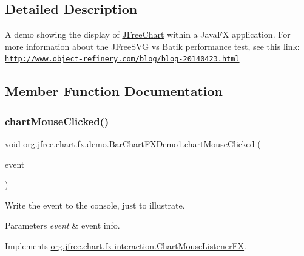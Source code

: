 \subsection{Detailed Description}
A demo showing the display of \mbox{\hyperlink{classorg_1_1jfree_1_1chart_1_1_j_free_chart}{J\+Free\+Chart}} within a Java\+FX application. For more information about the J\+Free\+S\+VG vs Batik performance test, see this link\+: \href{http://www.object-refinery.com/blog/blog-20140423.html}{\tt http\+://www.\+object-\/refinery.\+com/blog/blog-\/20140423.\+html} 

\subsection{Member Function Documentation}
\mbox{\label{classorg_1_1jfree_1_1chart_1_1fx_1_1demo_1_1_bar_chart_f_x_demo1_af23c9d454410ccba9b31d1b99ac0f153}} 
\subsubsection{\texorpdfstring{chart\+Mouse\+Clicked()}{chartMouseClicked()}}
{\footnotesize\ttfamily void org.\+jfree.\+chart.\+fx.\+demo.\+Bar\+Chart\+F\+X\+Demo1.\+chart\+Mouse\+Clicked (\begin{DoxyParamCaption}\item[{\mbox{\hyperlink{classorg_1_1jfree_1_1chart_1_1fx_1_1interaction_1_1_chart_mouse_event_f_x}{Chart\+Mouse\+Event\+FX}}}]{event }\end{DoxyParamCaption})}

Write the event to the console, just to illustrate.


\begin{DoxyParams}{Parameters}
{\em event} & event info. \\
\hline
\end{DoxyParams}


Implements \mbox{\hyperlink{interfaceorg_1_1jfree_1_1chart_1_1fx_1_1interaction_1_1_chart_mouse_listener_f_x_a7953c88563d5cd432d8232f3ade82403}{org.\+jfree.\+chart.\+fx.\+interaction.\+Chart\+Mouse\+Listener\+FX}}.

